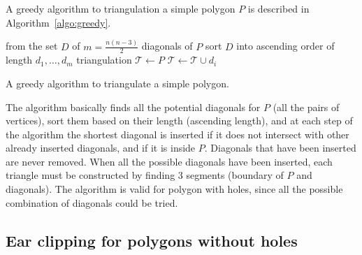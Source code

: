 A greedy algorithm to triangulation a simple polygon $P$ is described in Algorithm~\ref{algo:greedy}.
\begin{algorithm}[tb] 
  from the set $D$ of $m=\frac{n(n-3)}{2}$ diagonals of $P$\;
  sort $D$ into ascending order of length $d_1, \ldots, d_m$\;
  triangulation $\mathcal{T} \leftarrow P$\;
  {
    {
      $\mathcal{T} \leftarrow \mathcal{T} \cup d_i$\;
    }
  }
  \caption{A greedy algorithm to triangulate a simple polygon.}
\label{algo:greedy}
\end{algorithm}
The algorithm basically finds all the potential diagonals for $P$ (all the pairs of vertices), sort them based on their length (ascending length), and at each step of the algorithm the shortest diagonal is inserted if it does not intersect with other already inserted diagonals, and if it is inside $P$. 
Diagonals that have been inserted are never removed. 
When all the possible diagonals have been inserted, each triangle must be constructed by finding 3 segments (boundary of $P$ and diagonals). 
The algorithm is valid for polygon with holes, since all the possible combination of diagonals could be tried.


%
\subsection{Ear clipping for polygons without holes}

